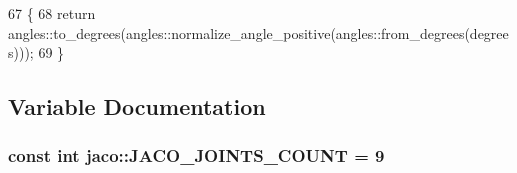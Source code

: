 \begin{DoxyCode}
67 \{
68     \textcolor{keywordflow}{return} angles::to\_degrees(angles::normalize\_angle\_positive(angles::from\_degrees(degrees)));
69 \}
\end{DoxyCode}


\subsection{Variable Documentation}
\subsubsection[{\texorpdfstring{J\+A\+C\+O\+\_\+\+J\+O\+I\+N\+T\+S\+\_\+\+C\+O\+U\+NT}{JACO_JOINTS_COUNT}}]{\setlength{\rightskip}{0pt plus 5cm}const int jaco\+::\+J\+A\+C\+O\+\_\+\+J\+O\+I\+N\+T\+S\+\_\+\+C\+O\+U\+NT = 9\hspace{0.3cm}{\ttfamily [static]}}\hypertarget{namespacejaco_a842fe600d7cc8aba974c8e39e0d88399}{}\label{namespacejaco_a842fe600d7cc8aba974c8e39e0d88399}
